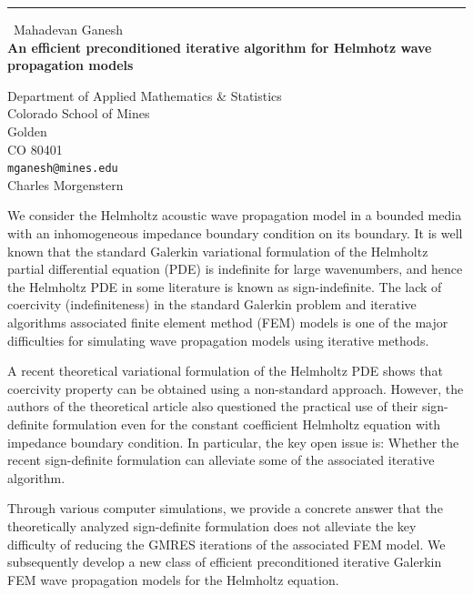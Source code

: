 \documentclass{report}
\begin{document}
\begin{center}
\rule{6in}{1pt} \
{\large Mahadevan Ganesh \\
{\bf An efficient preconditioned iterative algorithm for Helmhotz wave propagation models}}

Department of Applied Mathematics \& Statistics \\ Colorado School of Mines \\ Golden \\ CO 80401
\\
{\tt mganesh@mines.edu}\\
Charles Morgenstern\end{center}

We consider the Helmholtz acoustic wave propagation model in a bounded media
with an inhomogeneous impedance boundary condition on its boundary. It is
well known that the standard Galerkin variational formulation of the
Helmholtz partial differential equation (PDE) is indefinite for large
wavenumbers, and hence the Helmholtz PDE in some literature is known as
sign-indefinite.
The lack of coercivity (indefiniteness) in the standard Galerkin problem and
iterative algorithms associated finite element method (FEM) models is one
of the major difficulties for simulating wave propagation models using
iterative methods.

A recent theoretical variational formulation of the Helmholtz PDE shows
that coercivity property can be obtained using a non-standard approach.
However, the authors of the theoretical article also questioned the
practical use of their sign-definite formulation even for the constant
coefficient Helmholtz equation with impedance boundary condition. In
particular, the key open issue is: Whether the recent sign-definite
formulation can alleviate some of the associated iterative algorithm.

Through various computer simulations, we provide a concrete answer that the
theoretically analyzed sign-definite formulation does not alleviate the key difficulty
of reducing the GMRES iterations of the associated FEM model.
We subsequently develop a new class of efficient preconditioned iterative
Galerkin FEM wave propagation models for the Helmholtz equation.
\end{document}
